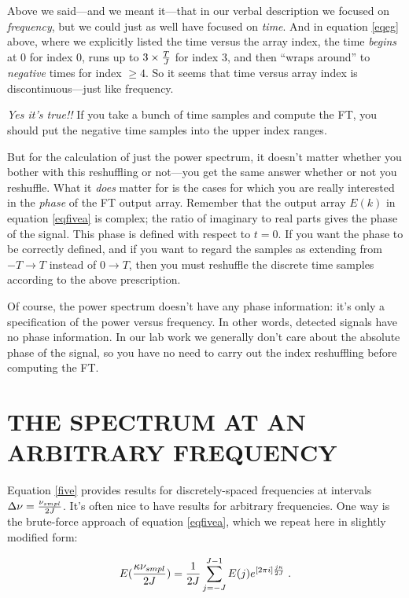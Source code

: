 \documentclass[11pt,preprint]{aastex}
\begin{document}
\label{noncontinuous}

	Above we said---and we meant it---that in our verbal description
we focused on {\it frequency}, but we could just as well have focused
on {\it time}. And in equation \ref{eqeg} above, where we explicitly listed
the time versus the array index, the time {\it begins} at $0$ for index 0, runs 
up to $3 \times {T \over J}$ for index $3$,
and then ``wraps around'' to {\it negative} times for index $\ge 4$.
So it seems that time versus array index is discontinuous---just like
frequency. 

	{\it Yes it's true!!} If you take a bunch of time samples and
compute the FT, you should put the negative time samples into the upper
index ranges. 

	But for the calculation of just the power spectrum, it doesn't
matter whether you bother with this reshuffling or not---you get the
same answer whether or not you reshuffle.  What it {\it does} matter for
is the cases for which you are really interested in the {\it phase} of
the FT output array.  Remember that the output array $E(k)$ in equation
\ref{eqfivea} is complex; the ratio of imaginary to real parts gives the
phase of the signal.  This phase is defined with respect to $t=0$.  If
you want the phase to be correctly defined, and if you want to regard
the samples as extending from $-T \rightarrow T$ instead of $0
\rightarrow T$, then you must reshuffle the discrete time samples
according to the above prescription. 

	Of course, the power spectrum doesn't have any phase
information: it's only a specification of the power versus frequency. 
In other words, detected signals have no phase information.  In our lab
work we generally don't care about the absolute phase of the signal, so
you have no need to carry out the index reshuffling before computing the
FT. 

\section{THE SPECTRUM AT AN ARBITRARY FREQUENCY}

	Equation \ref{five} provides results for discretely-spaced
frequencies at intervals $\Delta \nu = {\nu_{smpl} \over 2J}$. It's
often nice to have results for arbitrary frequencies. One way is the
brute-force approach  of equation \ref{eqfivea}, which we repeat here in
slightly modified form:

\begin{equation} \label{eqfiveb}
E({\kappa \nu_{smpl} \over 2J}) = {1 \over 2J} \sum_{j=-J}^{J-1}  E(j)
e^{[2 \pi i] {j\kappa \over 2J} } \; .
\end{equation}
\end{document}
